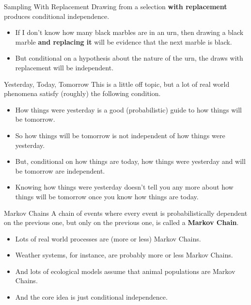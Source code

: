 \documentclass[
  ignorenonframetext,
]{beamer}
\providecommand{\tightlist}{%
  \setlength{\itemsep}{0pt}\setlength{\parskip}{0pt}}
\renewcommand{\,}{\text{, }}
\begin{document}
\begin{frame}{Sampling With Replacement}
\protect\hypertarget{sampling-with-replacement}{}
Drawing from a selection \textbf{with replacement} produces conditional
independence.

\begin{itemize}
\tightlist
\item
  If I don't know how many black marbles are in an urn, then drawing a
  black marble \textbf{and replacing it} will be evidence that the next
  marble is black.
\item
  But conditional on a hypothesis about the nature of the urn, the draws
  with replacement will be independent.
\end{itemize}
\end{frame}

\begin{frame}{Yesterday, Today, Tomorrow}
\protect\hypertarget{yesterday-today-tomorrow}{}
This is a little off topic, but a lot of real world phenomena satisfy
(roughly) the following condition.

\begin{itemize}
\tightlist
\item
  How things were yesterday is a good (probabilistic) guide to how
  things will be tomorrow.
\item
  So how things will be tomorrow is not independent of how things were
  yesterday. \pause
\item
  But, conditional on how things are today, how things were yesterday
  and will be tomorrow are independent.
\item
  Knowing how things were yesterday doesn't tell you any more about how
  things will be tomorrow once you know how things are today.
\end{itemize}
\end{frame}

\begin{frame}{Markov Chains}
\protect\hypertarget{markov-chains}{}
A chain of events where every event is probabilistically dependent on
the previous one, but only on the previous one, is called a
\textbf{Markov Chain}. \pause

\begin{itemize}
\tightlist
\item
  Lots of real world processes are (more or less) Markov Chains.
\item
  Weather systems, for instance, are probably more or less Markov
  Chains.
\item
  And lots of ecological models assume that animal populations are
  Markov Chains.
\item
  And the core idea is just conditional independence.
\end{itemize}
\end{frame}
\end{document}

